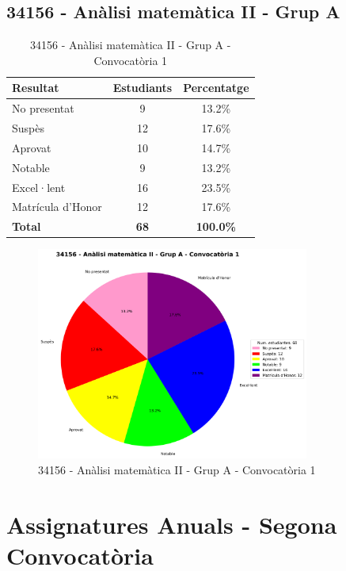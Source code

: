 \documentclass[12pt,a4paper]{article}
\begin{document}
\subsection{34156 - Anàlisi matemàtica II - Grup A}


\begin{table}[H]
\centering
\caption{34156 - Anàlisi matemàtica II - Grup A - Convocatòria 1}
\begin{tabular}{|l|c|c|}
\hline
\textbf{Resultat} & \textbf{Estudiants} & \textbf{Percentatge} \\
\hline
No presentat & 9 & 13.2\% \\
Suspès & 12 & 17.6\% \\
Aprovat & 10 & 14.7\% \\
Notable & 9 & 13.2\% \\
Excel·lent & 16 & 23.5\% \\
Matrícula d'Honor & 12 & 17.6\% \\
\hline
\textbf{Total} & \textbf{68} & \textbf{100.0\%} \\
\hline
\end{tabular}
\end{table}

\begin{figure}[H]
\centering
\includegraphics[width=0.8\textwidth]{graficos/34156_A_A1.png}
\caption{34156 - Anàlisi matemàtica II - Grup A - Convocatòria 1}
\end{figure}

\newpage


\section{Assignatures Anuals - Segona Convocatòria}
\end{document}
